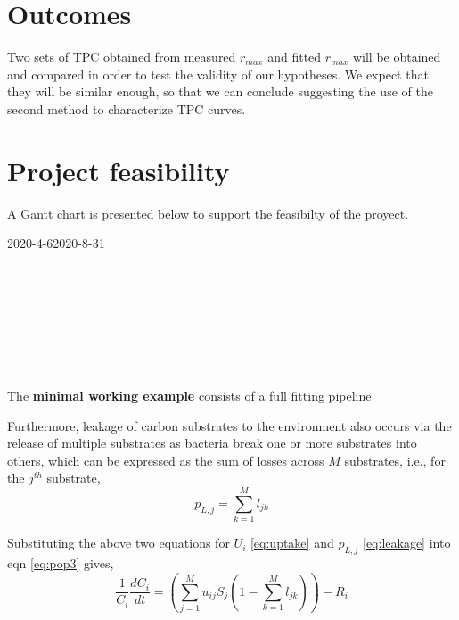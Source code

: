 \documentclass[titlepage,11pt]{article}
\begin{document}
\begin{linenumbers}
		\section{Outcomes}
			Two sets of TPC obtained from measured $ r_{max} $ and fitted $ r_{max} $ will be obtained and compared in order to test the validity of our hypotheses. We expect that they will be similar enough, so that we can conclude suggesting the use of the second method to characterize TPC curves.
		\section{Project feasibility}
			A Gantt chart is presented below to support the feasibilty of the proyect.
		\begin{center}
			
			\begin{ganttchart}[time slot format=isodate,
											x unit=0.08cm,
											hgrid]{2020-4-6}{2020-8-31} 
				 \\ 
				\\
				\\
				\\
				\\
				\\
				\\
				\\
				
			\end{ganttchart}
		The \textbf{minimal working example} consists of a full fitting pipeline 
		\end{center}
	
	Furthermore, leakage of carbon substrates to the environment also occurs via the release of multiple substrates as bacteria break one or more substrates into others, which can be expressed as the sum of losses across $M$ substrates, i.e., for the $j^{th}$ substrate,
	$$\label{eq:leakage} p_{L,j} = \sum\limits_{k = 1}^M l_{jk} $$
	
	Substituting the above two equations for $U_i$ \eqref{eq:uptake} and $p_{L,j}$ \eqref{eq:leakage} into eqn \eqref{eq:pop3} gives,
	$$ \frac{1}{C_i}\frac{dC_i}{dt} = \left(\sum_{j=1}^M u_{ij} S_j \left(1 - \sum\limits_{k = 1}^M l_{jk}\right)\right) - R_i $$
	
	\end{linenumbers}

	\newpage
	
	
	
\end{document}
